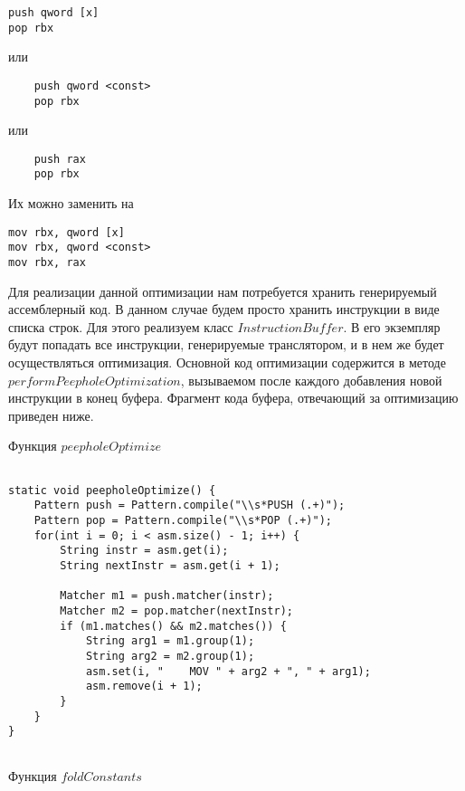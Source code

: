 \begin{Verbatim}
push qword [x]
pop rbx
\end{Verbatim}
или
\begin{Verbatim}
    push qword <const>
    pop rbx
\end{Verbatim}
или 
\begin{Verbatim}
    push rax
    pop rbx
\end{Verbatim}

Их можно заменить на
\begin{Verbatim}
mov rbx, qword [x]
mov rbx, qword <const>
mov rbx, rax
\end{Verbatim}

Для реализации данной оптимизации нам потребуется хранить генерируемый ассемблерный код. В данном случае будем просто хранить инструкции в виде списка строк. Для этого реализуем класс $InstructionBuffer$. В его экземпляр будут попадать все инструкции, генерируемые транслятором, и в нем же будет осуществляться оптимизация. Основной код оптимизации содержится в методе $performPeepholeOptimization$, вызываемом после каждого добавления новой инструкции в конец буфера. Фрагмент кода буфера, отвечающий за оптимизацию приведен ниже.

Функция $peepholeOptimize$

\begin{Verbatim}

static void peepholeOptimize() {
	Pattern push = Pattern.compile("\\s*PUSH (.+)");
	Pattern pop = Pattern.compile("\\s*POP (.+)");
	for(int i = 0; i < asm.size() - 1; i++) {
		String instr = asm.get(i);
		String nextInstr = asm.get(i + 1);

		Matcher m1 = push.matcher(instr);
		Matcher m2 = pop.matcher(nextInstr);
		if (m1.matches() && m2.matches()) {
			String arg1 = m1.group(1);
			String arg2 = m2.group(1);
			asm.set(i, "    MOV " + arg2 + ", " + arg1);
			asm.remove(i + 1);
		}
	}	
}


\end{Verbatim}

Функция $foldConstants$


